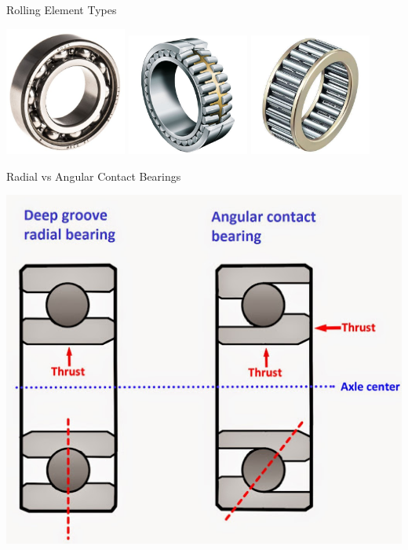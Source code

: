 \documentclass[10pt, svgnames]{beamer}
\begin{document}
\begin{frame}[label={sec:orge9dc45e}]{Rolling Element Types}
\begin{center}
\includegraphics[width=0.3\textwidth]{./pictures/ball-bearing.jpg}
\includegraphics[width=0.3\textwidth]{./pictures/roller-bearing.jpg}
\includegraphics[width=0.3\textwidth]{./pictures/needle-roller-bearing.jpg}
\end{center}
\end{frame}

\begin{frame}[label={sec:org701db45}]{Radial vs Angular Contact Bearings}
\begin{center}
\includegraphics[width=.9\linewidth]{./pictures/radial-vs-angular.jpg}
\end{center}
\end{frame}
\end{document}
